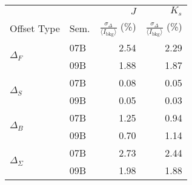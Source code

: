 \begin{tabular}{ll|rr}
&  & $J$ & $K_s$ \\ %
Offset Type & Sem. & $\frac{\sigma_\Delta}{\langle I_\mathrm{bkg}\rangle }$ (\%) & $\frac{\sigma_\Delta}{\langle I_\mathrm{bkg}\rangle }$ (\%) \\
\hline
\multirow{2}{*}{$\Delta_F$} & 07B & 2.54 & 2.29 \\
& 09B  & 1.88 & 1.87 \\
\hline
\multirow{2}{*}{$\Delta_S$} & 07B & 0.08 & 0.05 \\
& 09B & 0.05 & 0.03 \\
\hline
\multirow{2}{*}{$\Delta_B$} & 07B & 1.25 & 0.94 \\
& 09B &  0.70 & 1.14 \\
\hline
\multirow{2}{*}{$\Delta_\Sigma$} & 07B  & 2.73 & 2.44 \\
& 09B & 1.98 & 1.88 \\
\end{tabular}
